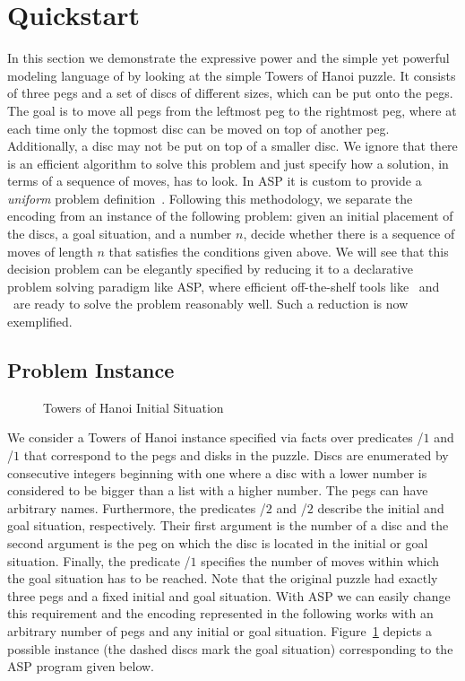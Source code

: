 %
\section{Quickstart}\label{sec:quickstart}
In this section we demonstrate the expressive power 
and the simple yet powerful modeling language of \gringo{}
by looking at the simple Towers of Hanoi puzzle.
It consists of three pegs and a set of discs of different sizes, 
which can be put onto the pegs. 
The goal is to move all pegs from the leftmost peg to the rightmost peg,
where at each time only the topmost disc can be moved on top of another peg.
Additionally, a disc may not be put on top of a smaller disc.
We ignore that there is an efficient algorithm to solve this problem 
and just specify how a solution, in terms of a sequence of moves, has to look.
In ASP it is custom to provide a \emph{uniform}
problem definition~\cite{martru99a,niemela99a,schlipf95a}.
Following this methodology, we separate the encoding
from an instance of the following problem:
given an initial placement of the discs, a goal situation, and a number $n$,
decide whether there is a sequence of moves of length $n$ 
that satisfies the conditions given above.
We will see that this decision problem can be elegantly 
specified by reducing it to a declarative problem solving paradigm like ASP,
where efficient off-the-shelf tools like \gringo\ and \clasp\
are ready to solve the problem reasonably well.
Such a reduction is now exemplified.

\subsection{Problem Instance}

\begin{figure}[tb]
\centering
\hanoiInstance
\caption{Towers of Hanoi Initial Situation\label{fig:toh_inst}}
\end{figure}

We consider a Towers of Hanoi instance specified via facts over predicates
\pred{peg}/$1$ and \pred{disk}/$1$ that correspond to the pegs and disks in the puzzle.
Discs are enumerated by consecutive integers beginning with one
where a disc with a lower number is considered to be bigger than a list with a higher number.
The pegs can have arbitrary names. 
Furthermore, the predicates /$2$ and /$2$ describe the initial and goal situation, respectively.
Their first argument is the number of a disc and the second argument is the peg 
on which the disc is located in the initial or goal situation.
Finally, the predicate /$1$ specifies the number of moves within which the goal situation has to be reached.
Note that the original puzzle had exactly three pegs and a fixed initial and goal situation.
With ASP we can easily change this requirement and 
the encoding represented in the following works with an arbitrary number of pegs and any initial or goal situation.
Figure~\ref{fig:toh_inst} depicts a possible instance (the dashed discs mark the goal situation) 
corresponding to the ASP program given below.

